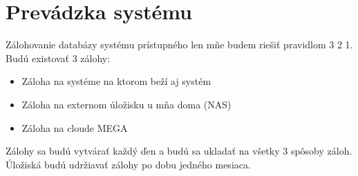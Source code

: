\chapter{Prevádzka systému}

Zálohovanie databázy systému prístupného len mňe budem riešiť pravidlom 3 2 1. Budú existovať 3 zálohy:
\begin{itemize}
  \item Záloha na systéme na ktorom beží aj systém
  \item Záloha na externom úložisku u mňa doma (NAS)
  \item Záloha na cloude MEGA
\end{itemize}
Zálohy sa budú vytvárať každý ďen a budú sa ukladať na všetky 3 spôsoby záloh. Úložiská budú udržiavať zálohy po dobu jedného mesiaca.